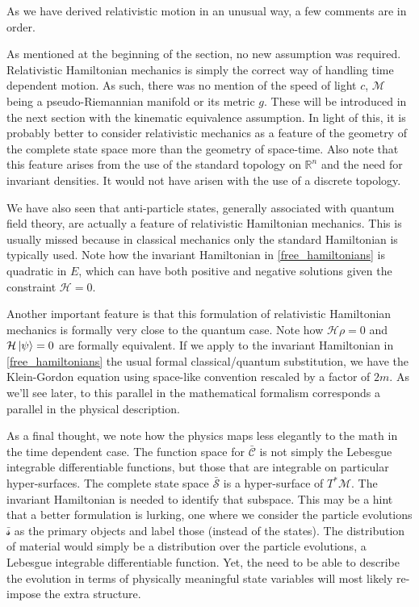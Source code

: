 \documentclass[smallextended]{svjour3}
\numberwithin{equation}{section}
\theoremstyle{definition}
\begin{document}
As we have derived relativistic motion in an unusual way, a few comments are in order.

As mentioned at the beginning of the section, no new assumption was required. Relativistic Hamiltonian mechanics is simply the correct way of handling time dependent motion. As such, there was no mention of the speed of light $c$, $\mathcal{M}$ being a pseudo-Riemannian manifold or its metric $g$. These will be introduced in the next section with the kinematic equivalence assumption. In light of this, it is probably better to consider relativistic mechanics as a feature of the geometry of the complete state space more than the geometry of space-time. Also note that this feature arises from the use of the standard topology on $\mathbb{R}^n$ and the need for invariant densities. It would not have arisen with the use of a discrete topology.

We have also seen that anti-particle states, generally associated with quantum field theory, are actually a feature of relativistic Hamiltonian mechanics. This is usually missed because in classical mechanics only the standard Hamiltonian is typically used. Note how the invariant Hamiltonian in \ref{free_hamiltonians} is quadratic in $E$, which can have both positive and negative solutions given the constraint $\mathcal{H}=0$.

Another important feature is that this formulation of relativistic Hamiltonian mechanics is formally very close to the quantum case. Note how $\mathcal{H} \rho = 0$ and $\mathcal{H} \ket{\psi} = 0$ are formally equivalent. If we apply to the invariant Hamiltonian in \ref{free_hamiltonians} the usual formal classical/quantum substitution, we have the Klein-Gordon equation using space-like convention rescaled by a factor of $2m$. As we'll see later, to this parallel in the mathematical formalism corresponds a parallel in the physical description.

As a final thought, we note how the physics maps less elegantly to the math in the time dependent case. The function space for $\bar{\mathcal{C}}$ is not simply the Lebesgue integrable differentiable functions, but those that are integrable on particular hyper-surfaces. The complete state space $\bar{\mathcal{S}}$ is a hyper-surface of $T^*\mathcal{M}$. The invariant Hamiltonian is needed to identify that subspace. This may be a hint that a better formulation is lurking, one where we consider the particle evolutions $\bar{\mathcal{s}}$ as the primary objects and label those (instead of the states). The distribution of material would simply be a distribution over the particle evolutions, a Lebesgue integrable differentiable function. Yet, the need to be able to describe the evolution in terms of physically meaningful state variables will most likely re-impose the extra structure.
\end{document}

